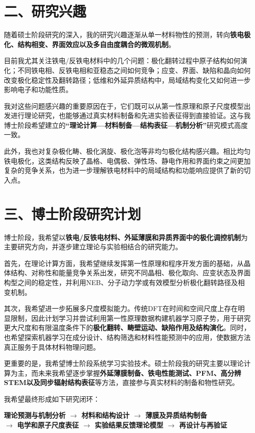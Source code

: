 \section{二、研究兴趣}

随着硕士阶段研究的深入，我的研究兴趣逐渐从单一材料物性的预测，转向\textbf{铁电极化、结构相变、界面效应以及多自由度耦合的微观机制}。

目前我尤其关注铁电/反铁电材料中的几个问题：极化翻转过程中原子结构如何演化；不同铁电相、反铁电相和亚稳态之间如何竞争；应变、界面、缺陷和晶向如何改变极化稳定性及翻转路径；低维和外延异质结构中，局域结构变化又如何进一步影响电子和功能性质。

\newpage
我对这些问题感兴趣的重要原因在于，它们既可以从第一性原理和原子尺度模型出发进行理论研究，也能够通过真实材料制备和先进实验表征得到直接验证。这与我博士阶段希望建立的\textbf{“理论计算—材料制备—结构表征—机制分析”}研究模式高度一致。

此外，我也对复杂极化畴、极化涡旋、极化泡等非均匀极化结构感兴趣。相比均匀铁电极化，这类结构反映了晶格、电偶极、弹性场、静电作用和界面约束之间更加复杂的竞争关系，也为进一步理解铁电材料中的局域结构和功能响应提供了新的切入点。

\section{三、博士阶段研究计划}

博士阶段，我希望以\textbf{铁电/反铁电材料、外延薄膜和异质界面中的极化调控机制}为主要研究方向，并逐步建立理论与实验相结合的研究能力。

首先，在理论计算方面，我希望继续发挥第一性原理和程序开发方面的基础，从晶体结构、对称性和能量竞争关系出发，研究不同晶相、极化取向、应变状态及界面构型之间的稳定性，并利用NEB、分子动力学或有效模型分析极化翻转路径及相变机制。

其次，我希望进一步拓展多尺度模拟能力。传统DFT在时间和空间尺度上存在明显限制，因此计划学习并尝试利用第一性原理数据构建机器学习原子势，用于研究更大尺度和有限温度条件下的\textbf{极化翻转、畴壁运动、缺陷作用及结构演化}。同时，也希望探索机器学习在成分设计、结构筛选和材料性能预测中的应用，使数据方法真正服务于具体材料物理问题。

更重要的是，我希望博士阶段系统学习实验技术。硕士阶段我的研究主要以理论计算为主，而未来我希望逐步掌握\textbf{外延薄膜制备、铁电性能测试、PFM、高分辨STEM以及同步辐射结构表征}等方法，直接参与真实材料的制备和物性研究。

我希望最终形成如下研究闭环：

\begin{center}
\sffamily\small\bfseries\color{StatementTeal}
理论预测与机制分析 $\rightarrow$ 材料和结构设计 $\rightarrow$ 薄膜及异质结构制备\\[-0.1em]
$\rightarrow$ 电学和原子尺度表征 $\rightarrow$ 实验结果反馈理论模型 $\rightarrow$ 再设计与再验证
\end{center}

